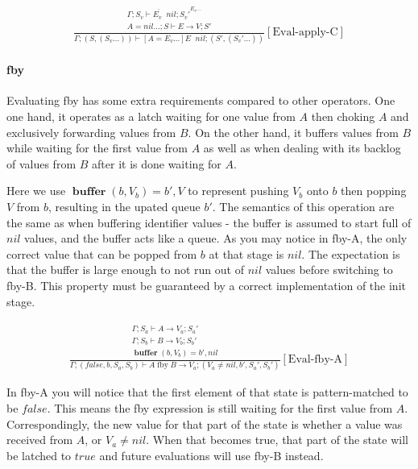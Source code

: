 \documentclass{scrartcl}
\DeclareMathOperator{\fby}{fby}
\DeclareMathOperator{\ceval}{\overset{C}{\rightarrow}}
\DeclareMathOperator{\buffer}{\mathbf{buffer}}
\begin{document}
    \begin{align*}
    \frac{
        \begin{matrix}
        \overline{\Gamma; S_v \vdash E_v \ceval nil; S_v'}^{E_v...} \\
        A = nil...; S \vdash E \rightarrow V; S'
        \end{matrix}
    }{
        \Gamma; (S, (S_v...)) \vdash [A=E_v...]E \ceval nil; (S', (S_v'...))
    }[\text{Eval-apply-C}]
    \end{align*}
    
    \paragraph{fby}
    
    Evaluating fby has some extra requirements compared to other operators. One one hand, it operates as a latch waiting for one value from $A$ then choking $A$ and exclusively forwarding values from $B$. On the other hand, it buffers values from $B$ while waiting for the first value from $A$ as well as when dealing with its backlog of values from $B$ after it is done waiting for $A$.
    
    Here we use $\buffer(b, V_b) = b', V$ to represent pushing $V_b$ onto $b$ then popping $V$ from $b$, resulting in the upated queue $b'$. The semantics of this operation are the same as when buffering identifier values - the buffer is assumed to start full of $nil$ values, and the buffer acts like a queue. As you may notice in fby-A, the only correct value that can be popped from $b$ at that stage is $nil$. The expectation is that the buffer is large enough to not run out of $nil$ values before switching to fby-B. This property must be guaranteed by a correct implementation of the init stage.
    
    \begin{align*}
    \frac{
        \begin{matrix}
        \Gamma; S_a \vdash A \rightarrow V_a; S_a' \\
        \Gamma; S_b \vdash B \rightarrow V_b; S_b' \\
        \buffer(b, V_b) = b', nil
        \end{matrix}
    }{
        \Gamma; (false, b, S_a, S_b) \vdash A \fby B \rightarrow V_a; (V_a \neq nil, b', S_a', S_b')
    }[\text{Eval-fby-A}]
    \end{align*}
    
    In fby-A you will notice that the first element of that state is pattern-matched to be $false$. This means the fby expression is still waiting for the first value from $A$. Correspondingly, the new value for that part of the state is whether a value was received from $A$, or $V_a \neq nil$. When that becomes true, that part of the state will be latched to $true$ and future evaluations will use fby-B instead.
    
\end{document}

